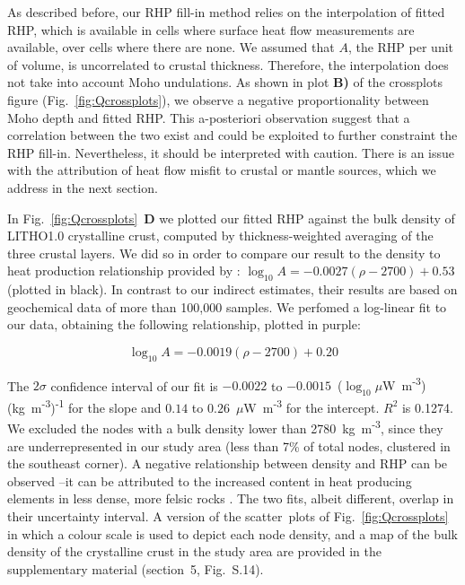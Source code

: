 {As described before, our RHP fill-in method relies on the interpolation of fitted RHP, which is available in cells where surface heat flow measurements are available, over cells where there are none.
We assumed that $A$, the RHP per unit of volume, is uncorrelated to crustal thickness.
Therefore, the interpolation does not take into account Moho undulations.
As shown in plot \textbf{B)} of the crossplots figure (Fig.~\ref{fig:Qcrossplots}), we observe a negative proportionality between Moho depth and fitted RHP.
This a-posteriori observation suggest that a correlation between the two exist and could be exploited to further constraint the RHP fill-in.
Nevertheless, it should be interpreted with caution.
There is an issue with the attribution of heat flow misfit to crustal or mantle sources, which we address in the next section.

In Fig.~\ref{fig:Qcrossplots}~\textbf{D} we plotted our fitted RHP against the bulk density of LITHO1.0 \parencite{Pasyanos2014} crystalline crust, computed by thickness-weighted averaging of the three crustal layers.
We did so in order to compare our result to the density to heat production relationship provided by \textcite{Hasterok2017_ign}: $\log_{10} A = -0.0027 (\rho - 2700) + 0.53 $ (plotted in black).
In contrast to our indirect estimates, their results are based on geochemical data of more than {100,000} samples.
We perfomed a log-linear fit to our data, obtaining the following relationship, plotted in purple:

\begin{equation}
	\label{eq:RHP_RHO_fit}
	\log_{10} A = -0.0019 (\rho - 2700) + 0.20
\end{equation}

The $2\sigma$ confidence interval of our fit is $-0.0022$ to $-0.0015$~{($\log_{10} \mu$W~m\textsuperscript{-3})(kg~m\textsuperscript{-3})\textsuperscript{-1}} for the slope and $0.14$ to $0.26$~{$\mu$W~m\textsuperscript{-3}} for the intercept.
$R^2$ is {0.1274}.
We excluded the nodes with a bulk density lower than 2780~{kg~m\textsuperscript{-3}}, since they are underrepresented in our study area (less than 7\% of total nodes, clustered in the southeast corner).
A negative relationship between density and RHP can be observed --it can be attributed to the increased content in heat producing elements in less dense, more felsic rocks \parencite{Hasterok2017_ign}.
The two fits, albeit different, overlap in their uncertainty interval.
A version of the scatter~plots of Fig.~\ref{fig:Qcrossplots} in which a colour scale is used to depict each node density, and a map of the bulk density of the crystalline crust in the study area are provided in the supplementary material (section~5, Fig.~S.14).

}
